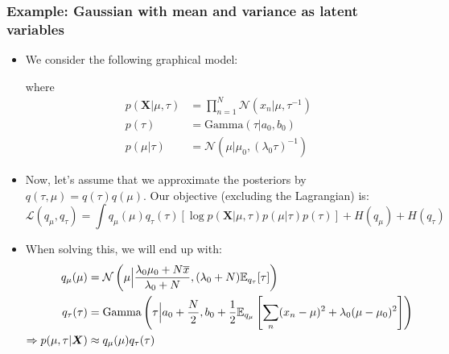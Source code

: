\subsubsection{Example: Gaussian with mean and variance as latent variables}
\begin{itemize}
	\item We consider the following graphical model:\\
	\begin{figure}[ht!]
		\centering
	\end{figure}

	where
	\begin{equation*}
		\begin{split}
			p(\bm{X}|\mu, \tau) & = \prod_{n=1}^{N} \mathcal{N}(x_n|\mu, \tau^{-1})\\
			p(\tau) & = \text{Gamma}(\tau|a_0, b_0)\\
			p(\mu|\tau) & = \mathcal{N}(\mu|\mu_0, (\lambda_0 \tau)^{-1})
		\end{split}
	\end{equation*}
	\item Now, let's assume that we approximate the posteriors by $q(\tau, \mu)=q(\tau)q(\mu)$. Our objective (excluding the Lagrangian) is:
	$$\mathcal{L}(q_{\mu}, q_{\tau}) = \int q_{\mu}(\mu)q_{\tau}(\tau)\left[\log p(\bm{X}|\mu, \tau)p(\mu|\tau)p(\tau)\right] + H(q_{\mu}) + H(q_{\tau})$$
	\item When solving this, we will end up with:
	\begin{equation*}
		\begin{split}
			q_{\mu}(\mu) & = \mathcal{N}\left(\mu\Big\vert \frac{\lambda_0\mu_0 + N\overline{x}}{\lambda_0 + N}, (\lambda_0 + N)\mathbb{E}_{q_{\tau}}[\tau]\right)\\
			q_{\tau}(\tau) & = \text{Gamma}\left(\tau\Big\vert a_0 + \frac{N}{2}, b_0 + \frac{1}{2}\mathbb{E}_{q_{\mu}}\left[\sum_n (x_n-\mu)^2+\lambda_0(\mu-\mu_0)^2\right]\right)\\
			\Rightarrow p(\mu, \tau|\bm{X}) &\approx q_{\mu}(\mu)q_{\tau}(\tau)
		\end{split}
	\end{equation*}
\end{itemize}
